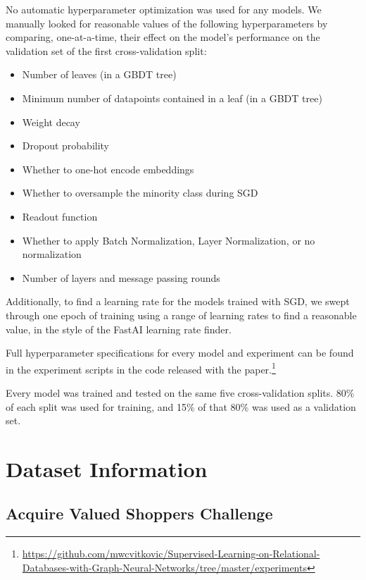 \documentclass{article}
\begin{document}
No automatic hyperparameter optimization was used for any models.  We manually looked for reasonable values of the following hyperparameters by comparing, one-at-a-time, their effect on the model's performance on the validation set of the first cross-validation split:
\begin{itemize}
\item Number of leaves (in a GBDT tree)
\item Minimum number of datapoints contained in a leaf (in a GBDT tree)
\item Weight decay
\item Dropout probability
\item Whether to one-hot encode embeddings
\item Whether to oversample the minority class during SGD
\item Readout function
\item Whether to apply Batch Normalization, Layer Normalization, or no normalization
\item Number of layers and message passing rounds
\end{itemize}

Additionally, to find a learning rate for the models trained with SGD, we swept through one epoch of training using a range of learning rates to find a reasonable value, in the style of the FastAI \citep{howard2018fastai} learning rate finder.

Full hyperparameter specifications for every model and experiment can be found in the experiment scripts in the code released with the paper.\footnote{\url{https://github.com/mwcvitkovic/Supervised-Learning-on-Relational-Databases-with-Graph-Neural-Networks/tree/master/experiments}}

Every model was trained and tested on the same five cross-validation splits.  80\% of each split was used for training, and 15\% of that 80\% was used as a validation set.


\section{Dataset Information}\label{sec:suppdatasetinfo}
\subsection{Acquire Valued Shoppers Challenge}
\end{document}
